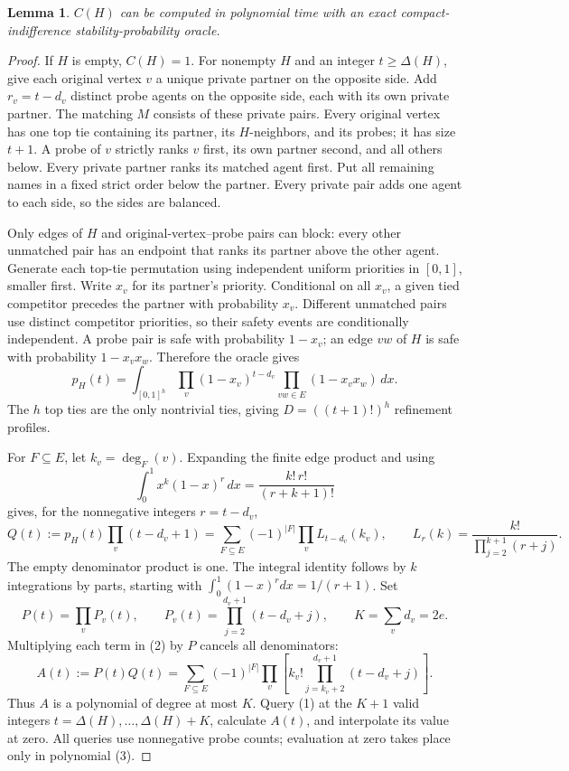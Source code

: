 \documentclass[11pt]{article}
\newtheorem{lemma}{Lemma}
\begin{document}
\begin{lemma}\label{lem:inner}
$C(H)$ can be computed in polynomial time with an exact
compact-indifference stability-probability oracle.
\end{lemma}
\begin{proof}
If $H$ is empty, $C(H)=1$. For nonempty $H$ and an integer
$t\geq\Delta(H)$, give each original vertex $v$ a unique
private partner on the opposite side. Add $r_v=t-d_v$ distinct probe
agents on the opposite side, each with its own private partner.
The matching $M$ consists of these private pairs.
Every original vertex has one top tie containing its partner, its
$H$-neighbors, and its probes; it has size $t+1$.
A probe of $v$ strictly ranks $v$ first, its own partner second, and all
others below. Every private partner ranks its matched agent first.
Put all remaining names in a fixed strict order below the partner.
Every private pair adds one agent to each side, so the sides are balanced.

Only edges of $H$ and original-vertex--probe pairs can block: every other
unmatched pair has an endpoint that ranks its partner above the other
agent. Generate each top-tie permutation using independent uniform
priorities in $[0,1]$, smaller first.
Write $x_v$ for its partner's priority.
Conditional on all $x_v$, a given tied competitor precedes the partner
with probability $x_v$. Different unmatched pairs use distinct competitor
priorities, so their safety events are conditionally independent.
A probe pair is safe with probability $1-x_v$; an edge $vw$ of $H$
is safe with probability $1-x_vx_w$. Therefore the oracle gives
\[
 p_H(t)=\int_{[0,1]^h}
       \prod_v(1-x_v)^{t-d_v}
       \prod_{vw\in E}(1-x_vx_w)\,dx.               \tag{1}
\]
The $h$ top ties are the only nontrivial ties, giving
$D=((t+1)!)^h$ refinement profiles.

For $F\subseteq E$, let $k_v=\deg_F(v)$.
Expanding the finite edge product and using
\[
 \int_0^1 x^k(1-x)^r\,dx=\frac{k!\,r!}{(r+k+1)!}
\]
gives, for the nonnegative integers $r=t-d_v$,
\[
 Q(t):=p_H(t)\prod_v(t-d_v+1)
      =\sum_{F\subseteq E}(-1)^{|F|}
          \prod_v L_{t-d_v}(k_v),\qquad
 L_r(k)=\frac{k!}{\prod_{j=2}^{k+1}(r+j)}.         \tag{2}
\]
The empty denominator product is one. The integral identity follows by
$k$ integrations by parts, starting with
$\int_0^1(1-x)^r dx=1/(r+1)$.
Set
\[
 P(t)=\prod_v P_v(t),\qquad
 P_v(t)=\prod_{j=2}^{d_v+1}(t-d_v+j),\qquad
 K=\sum_v d_v=2e.
\]
Multiplying each term in (2) by $P$ cancels all denominators:
\[
 A(t):=P(t)Q(t)
   =\sum_{F\subseteq E}(-1)^{|F|}
       \prod_v\left[
          k_v!\prod_{j=k_v+2}^{d_v+1}(t-d_v+j)
       \right].                                  \tag{3}
\]
Thus $A$ is a polynomial of degree at most $K$.
Query (1) at the $K+1$ valid integers
$t=\Delta(H),\ldots,\Delta(H)+K$, calculate $A(t)$, and interpolate
its value at zero. All queries use nonnegative probe counts; evaluation
at zero takes place only in polynomial (3).


\end{proof}
\end{document}
